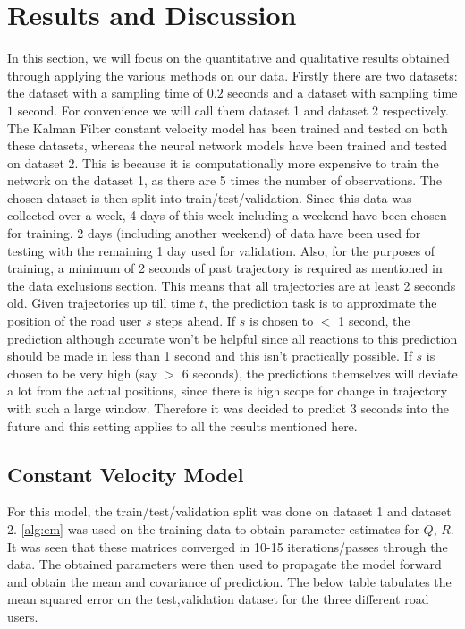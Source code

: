 \documentclass{article}
\begin{document}
\section{Results and Discussion}
In this section, we will focus on the quantitative and qualitative results obtained through applying the various methods on our data. Firstly there are two datasets: the dataset with a sampling time of $0.2$ seconds and a dataset with sampling time $1$ second. For convenience we will call them dataset 1 and dataset 2 respectively. The Kalman Filter constant velocity model has been trained and tested on both these datasets, whereas the neural network models have been trained and tested on dataset 2. This is because it is computationally more expensive to train the network on the dataset 1, as there are 5 times the number of observations. The chosen dataset is then split into train/test/validation. Since this data was collected over a week, 4 days of this week including a weekend have been chosen for training. 2 days (including another weekend) of data have been used for testing with the remaining 1 day used for validation. Also, for the purposes of training, a minimum of 2 seconds of past trajectory is required as mentioned in the data exclusions section. This means that all trajectories are at least 2 seconds old. Given trajectories up till time $t$, the prediction task is to approximate the position of the road user $s$ steps ahead. If $s$ is chosen to $<$ 1 second, the prediction although accurate won't be helpful since all reactions to this prediction should be made in less than 1 second and this isn't practically possible. If $s$ is chosen to be very high (say $>$ 6 seconds), the predictions themselves will deviate a lot from the actual positions, since there is high scope for change in trajectory with such a large window. Therefore it was decided to predict 3 seconds into the future and this setting applies to all the results mentioned here. 

\subsection{Constant Velocity Model}
For this model, the train/test/validation split was done on dataset 1 and dataset 2. \ref{alg:em} was used on the training data to obtain parameter estimates for $Q$, $R$. It was seen that these matrices converged in 10-15 iterations/passes through the data. The obtained parameters were then used to propagate the model forward and obtain the mean and covariance of prediction. The below table tabulates the mean squared error on the test,validation dataset for the three different road users. 
\end{document}
